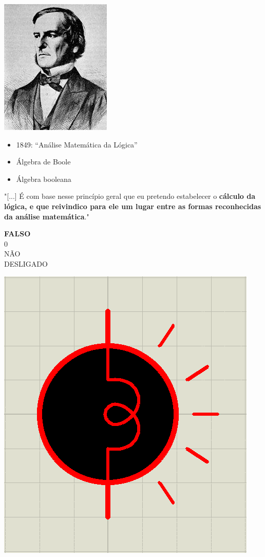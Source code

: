 \begin{multicols}{2}
	\begin{center}
		\includegraphics[height=.8\textheight]{./IMG/boole.jpg}
	\end{center}

\vfill
\columnbreak

\begin{itemize}
	\item 1849: “Análise Matemática da Lógica”
	\item Álgebra de Boole
	\item Álgebra booleana
\end{itemize}

"[...] É com base nesse princípio geral que eu pretendo estabelecer o \textbf{cálculo da lógica, e que reivindico para ele um lugar entre as formas reconhecidas da análise matemática}."

\vfill\null
\columnbreak
{\large \textbf{FALSO}\\
0\\
NÃO\\
DESLIGADO
}


\begin{center}
	\includegraphics[height=.7\textheight]{./IMG/FALSO.png}
\end{center}


\end{multicols}
